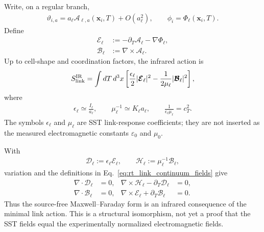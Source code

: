 Write, on a regular branch,
\begin{align}
    \vartheta_{i,a}
    =
    a_\ell\mathcal A_{\ell,a}(\mathbf x_i,T)
    +O(a_\ell^2),
    \qquad
    \phi_i=\Phi_\ell(\mathbf x_i,T).
\end{align}
Define
\begin{align}
    \boldsymbol{\mathcal E}_\ell
    &:=-\partial_T\boldsymbol{\mathcal A}_\ell-\nabla\Phi_\ell,
    \\
    \boldsymbol{\mathcal B}_\ell
    &:=\nabla\times\boldsymbol{\mathcal A}_\ell.
    \label{eq:rt_link_continuum_fields}
\end{align}
Up to cell-shape and coordination factors, the infrared action is
\begin{align}
    S_{\rm link}^{\rm IR}
    =
    \int dT\,d^3x
    \left[
        \frac{\epsilon_\ell}{2}
        |\boldsymbol{\mathcal E}_\ell|^2
        -
        \frac{1}{2\mu_\ell}
        |\boldsymbol{\mathcal B}_\ell|^2
    \right],
    \label{eq:rt_link_continuum_action}
\end{align}
where
\begin{align}
    \epsilon_\ell
    \simeq
    \frac{I_\ell}{a_\ell},
    \qquad
    \mu_\ell^{-1}
    \simeq
    K_\ell a_\ell,
    \qquad
    \frac{1}{\epsilon_\ell\mu_\ell}
    =c_T^2.
    \label{eq:rt_link_continuum_coefficients}
\end{align}
The symbols $\epsilon_\ell$ and $\mu_\ell$ are SST link-response coefficients;
they are not inserted as the measured electromagnetic constants
$\varepsilon_0$ and $\mu_0$.

With
\begin{align}
    \boldsymbol{\mathcal D}_\ell
    :=\epsilon_\ell\boldsymbol{\mathcal E}_\ell,
    \qquad
    \boldsymbol{\mathcal H}_\ell
    :=\mu_\ell^{-1}\boldsymbol{\mathcal B}_\ell,
\end{align}
variation and the definitions in Eq.~\eqref{eq:rt_link_continuum_fields} give
\begin{align}
    \nabla\cdot\boldsymbol{\mathcal D}_\ell&=0,
    &
    \nabla\times\boldsymbol{\mathcal H}_\ell
    -\partial_T\boldsymbol{\mathcal D}_\ell&=0,
    \\
    \nabla\cdot\boldsymbol{\mathcal B}_\ell&=0,
    &
    \nabla\times\boldsymbol{\mathcal E}_\ell
    +\partial_T\boldsymbol{\mathcal B}_\ell&=0.
    \label{eq:rt_link_source_free_maxwell_structure}
\end{align}
Thus the source-free Maxwell--Faraday form is an infrared consequence of the
minimal link action.  This is a structural isomorphism, not yet a proof that the
SST fields equal the experimentally normalized electromagnetic fields.

